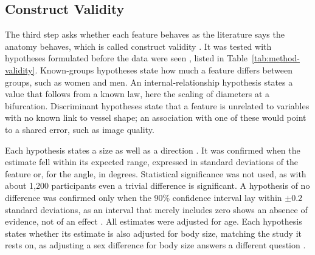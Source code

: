 \subsection{Construct Validity}
\label{sec:method-validity-groups}

The third step asks whether each feature behaves as the literature says the anatomy behaves, which is called construct validity \cite{mokkink2010cosmin}.
It was tested with hypotheses formulated before the data were seen \cite{cronbach1955construct, prinsen2018cosmin}, listed in Table~\ref{tab:method-validity}.
Known-groups hypotheses state how much a feature differs between groups, such as women and men.
An internal-relationship hypothesis states a value that follows from a known law, here the scaling of diameters at a bifurcation.
Discriminant hypotheses state that a feature is unrelated to variables with no known link to vessel shape; an association with one of these would point to a shared error, such as image quality.

Each hypothesis states a size as well as a direction \cite{terwee2007quality, prinsen2018cosmin}.
It was confirmed when the estimate fell within its expected range, expressed in standard deviations of the feature or, for the angle, in degrees.
Statistical significance was not used, as with about 1,200 participants even a trivial difference is significant.
A hypothesis of no difference was confirmed only when the 90\% confidence interval lay within $\pm 0.2$ standard deviations, as an interval that merely includes zero shows an absence of evidence, not of an effect \cite{lakens2017equivalence}.
All estimates were adjusted for age.
Each hypothesis states whether its estimate is also adjusted for body size, matching the study it rests on, as adjusting a sex difference for body size answers a different question \cite{schisterman2009overadjustment}.

